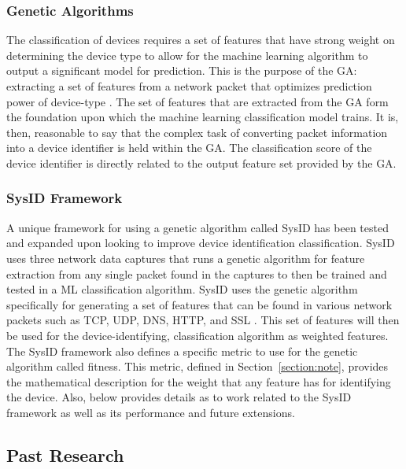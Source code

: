 \documentclass[11pt, titlepage]{article}
\begin{document}
		\subsubsection{Genetic Algorithms}
			The classification of devices requires a set of features that have strong weight on determining the device type to allow for the machine learning algorithm to output a significant model for prediction. This is the purpose of the GA: extracting a set of features from a network packet that optimizes prediction power of device-type \cite{SysID}. The set of features that are extracted from the GA form the foundation upon which the machine learning classification model trains. It is, then, reasonable to say that the complex task of converting packet information into a device identifier is held within the GA. The classification score of the device identifier is directly related to the output feature set provided by the GA. 
		
		\subsubsection{SysID Framework}
	A unique framework for using a genetic algorithm called SysID has been tested and expanded upon looking to improve device identification classification. SysID uses three network data captures that runs a genetic algorithm for feature extraction from any single packet found in the captures to then be trained and tested in a ML classification algorithm. SysID uses the genetic algorithm specifically for generating a set of features that can be found in various network packets such as TCP, UDP, DNS, HTTP, and SSL \cite{SysID}. This set of features will then be used for the device-identifying, classification algorithm as weighted features. The SysID framework also defines a specific metric to use for the genetic algorithm called fitness. This metric, defined in Section~\ref{section:note}, provides the mathematical description for the weight that any feature has for identifying the device. Also, below provides details as to work related to the SysID framework as well as its performance and future extensions.
	
	\subsection{Past Research}		
\end{document}
